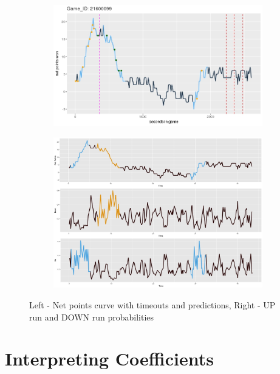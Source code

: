 \documentclass{article}
\begin{document}
\begin{figure}[h]
\centering
\begin{subfigure}{.5\textwidth}
  \centering
  \includegraphics[width=\linewidth]{Net_points_curry.jpeg}
  \label{fig:sub1}
\end{subfigure}%
\begin{subfigure}{.5\textwidth}
  \centering
  \includegraphics[width=\linewidth]{Pplot2.jpeg}
  \label{fig:sub2}
\end{subfigure}
\caption{Left - Net points curve with timeouts and predictions, Right - UP run and DOWN run probabilities}
\label{fig:test}
\end{figure}



\section{Interpreting Coefficients}
\end{document}
